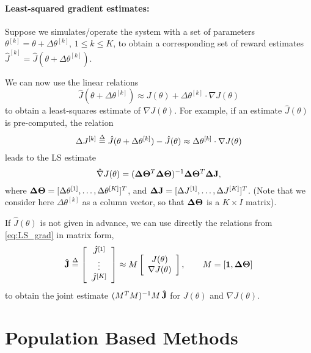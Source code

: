 \paragraph{Least-squared gradient estimates:}  Suppose we simulates/operate the system with a set of parameters ${\theta ^{[k]}} = \theta  + \Delta {\theta ^{[k]}}$, $1 \le k \le K$, to obtain a corresponding set of reward estimates ${\hat J^{[k]}} = \hat J(\theta  + \Delta {\theta ^{[k]}})$.

We can now use the linear relations
\begin{equation}\label{eq:LS_grad}
    \hat J(\theta  + \Delta {\theta ^{[k]}}) \approx J(\theta ) + \Delta {\theta ^{[k]}} \cdot \nabla J(\theta )
\end{equation}
to obtain a least-squares estimate of $\nabla J(\theta )$. For example, if an estimate $\hat J(\theta )$ is pre-computed, the relation
\[\Delta {J^{[k]}} \buildrel \Delta \over = \hat J(\theta  + \Delta {\theta ^{[k]}}) - \hat J(\theta ) \approx \Delta {\theta ^{[k]}} \cdot \nabla J(\theta )\]
leads to the LS estimate
\[\hat \nabla J(\theta ) = {({\bf{\Delta }}{{\bf{\Theta }}^T}{\bf{\Delta \Theta }})^{ - 1}}{\bf{\Delta }}{{\bf{\Theta }}^T}{\bf{\Delta J}},\]
where ${\bf{\Delta \Theta }} = {[\Delta {\theta ^{[1]}}, \ldots ,\Delta {\theta ^{[K]}}]^T}$, and ${\bf{\Delta J}} = {[\Delta {J^{[1]}}, \ldots ,\Delta {J^{[K]}}]^T}$.  (Note that we consider here $\Delta {\theta ^{[k]}}$ as a column vector, so that ${\bf{\Delta \Theta }}$ is a $K \times I$ matrix).

If $\hat J(\theta )$ is not given in advance, we can use directly the relations from \eqref{eq:LS_grad} in matrix form,
\[{\bf{\hat J}} \buildrel \Delta \over = \left[ {\begin{array}{*{20}{c}}
{{{\hat J}^{[1]}}}\\
 \vdots \\
{{{\hat J}^{[K]}}}
\end{array}} \right] \approx M\left[ {\begin{array}{*{20}{c}}
{J(\theta )}\\
{\nabla J(\theta )}
\end{array}} \right],\quad \quad M = [{\bf{1}},{\bf{\Delta \Theta }}]\]
to obtain the joint estimate ${({M^T}M)^{ - 1}}M\,{\bf{\hat J}}$ for $J(\theta )$ and $\nabla J(\theta )$.

\section{Population Based Methods}


